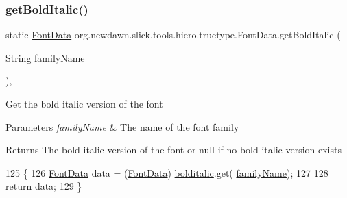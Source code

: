 \subsubsection{\texorpdfstring{get\+Bold\+Italic()}{getBoldItalic()}}
{\footnotesize\ttfamily static \mbox{\hyperlink{classorg_1_1newdawn_1_1slick_1_1tools_1_1hiero_1_1truetype_1_1_font_data}{Font\+Data}} org.\+newdawn.\+slick.\+tools.\+hiero.\+truetype.\+Font\+Data.\+get\+Bold\+Italic (\begin{DoxyParamCaption}\item[{String}]{family\+Name }\end{DoxyParamCaption})\hspace{0.3cm}{\ttfamily [inline]}, {\ttfamily [static]}}

Get the bold italic version of the font


\begin{DoxyParams}{Parameters}
{\em family\+Name} & The name of the font family \\
\hline
\end{DoxyParams}
\begin{DoxyReturn}{Returns}
The bold italic version of the font or null if no bold italic version exists 
\end{DoxyReturn}

\begin{DoxyCode}
125                                                             \{
126         \mbox{\hyperlink{classorg_1_1newdawn_1_1slick_1_1tools_1_1hiero_1_1truetype_1_1_font_data_a749bc5408e8c04106d580a31b5c9e597}{FontData}} data = (\mbox{\hyperlink{classorg_1_1newdawn_1_1slick_1_1tools_1_1hiero_1_1truetype_1_1_font_data_a749bc5408e8c04106d580a31b5c9e597}{FontData}}) \mbox{\hyperlink{classorg_1_1newdawn_1_1slick_1_1tools_1_1hiero_1_1truetype_1_1_font_data_a16536b4022d7f501f3e0c8be8621ccaf}{bolditalic}}.get(
      \mbox{\hyperlink{classorg_1_1newdawn_1_1slick_1_1tools_1_1hiero_1_1truetype_1_1_font_data_a287c606f09e3581f4eaea1b7bd81ded1}{familyName}});
127         
128         \textcolor{keywordflow}{return} data;
129     \}
\end{DoxyCode}
\mbox{\label{classorg_1_1newdawn_1_1slick_1_1tools_1_1hiero_1_1truetype_1_1_font_data_a4c170863a370f609118f9acbc8d598a7}} 
